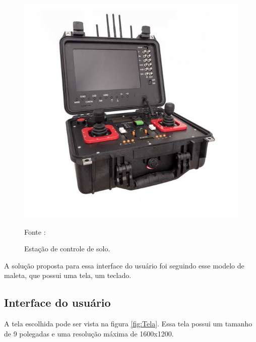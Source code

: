 \begin{figure}[H]
  \centering
  \includegraphics[scale=0.4]{figuras/DroneGroundStation.jpg}
  \caption{Estação de controle de solo.}
  {\footnotesize Fonte : \cite{AeroExpo}} 
  \label{fig:DroneStation}
\end{figure}


\par A solução proposta para essa interface do usuário foi seguindo esse modelo de maleta, que possui uma tela, um teclado.

\subsection{Interface do usuário}

\par A tela escolhida pode ser vista na figura \ref{fig:Tela}. Essa tela possui um tamanho de 9 polegadas e uma resolução máxima de 1600x1200. 


